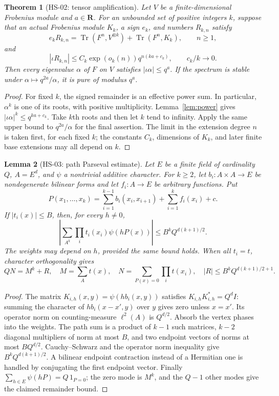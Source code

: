 \documentclass[11pt,a4paper]{article}
\newtheorem{theorem}{Theorem}[section]
\newtheorem{lemma}[theorem]{Lemma}
\theoremstyle{remark}
\begin{document}
\begin{theorem}[HS-02: tensor amplification]
\label{thm:tensor}
Let $V$ be a finite-dimensional Frobenius module and $a\in\mathbf R$.
For an unbounded set of positive integers $k$, suppose that an actual
Frobenius module $K_k$, a sign $e_k$, and numbers $R_{k,n}$ satisfy
\[
 e_kR_{k,n}=\operatorname{Tr}(F^n,V^{\otimes k})
                  +\operatorname{Tr}(F^n,K_k),\qquad n\ge1,
\]
and
\[
 |\iota R_{k,n}|\le C_k\exp(o_k(n))q^{n(ka+c_k)},
 \qquad c_k/k\longrightarrow0.
\]
Then every eigenvalue $\alpha$ of $F$ on $V$ satisfies
$|\iota\alpha|\le q^a$.
If the spectrum is stable under $\alpha\mapsto q^{2a}/\alpha$, it is pure
of modulus $q^a$.
\end{theorem}
\begin{proof}
For fixed $k$, the signed remainder is an effective power sum.  In
particular, $\alpha^k$ is one of its roots, with positive multiplicity.
Lemma~\ref{lem:power} gives
$|\iota\alpha|^k\le q^{ka+c_k}$.  Take $k$th roots and then let $k$ tend
to infinity.  Apply the same upper bound to $q^{2a}/\alpha$ for the final
assertion.  The limit in the extension degree $n$ is taken first, for each
fixed $k$; the constants $C_k$, dimensions of $K_k$, and later finite base
extensions may all depend on $k$.
\end{proof}

\begin{lemma}[HS-03: path Parseval estimate]
\label{lem:path}
Let $E$ be a finite field of cardinality $Q$, $A=E^d$, and $\psi$ a
nontrivial additive character.  For $k\ge2$, let $b_i:A\times A\to E$
be nondegenerate bilinear forms and let $f_i:A\to E$ be arbitrary
functions.  Put
\[
 P(x_1,\ldots,x_k)=\sum_{i=1}^{k-1}b_i(x_i,x_{i+1})
                         +\sum_{i=1}^k f_i(x_i)+c.
\]
If $|t_i(x)|\le B$, then, for every $h\ne0$,
\[
 \left|\sum_{A^k}\prod_i t_i(x_i)\psi(hP(x))\right|
       \le B^k Q^{d(k+1)/2}.
\]
The weights may depend on $h$, provided the same bound holds.  When all
$t_i=t$, character orthogonality gives
\[
 QN=M^k+R,\quad M=\sum_A t(x),\quad
 N=\sum_{P(x)=0}\prod_i t(x_i),\quad
 |R|\le B^k Q^{d(k+1)/2+1}.
\]
\end{lemma}
\begin{proof}
The matrix $K_{i,h}(x,y)=\psi(hb_i(x,y))$ satisfies
$K_{i,h}K_{i,h}^*=Q^d I$: summing the character of
$hb_i(x-x',y)$ over $y$ gives zero unless $x=x'$.  Its operator norm on
counting-measure $\ell^2(A)$ is $Q^{d/2}$.  Absorb the vertex phases into
the weights.  The path sum is a product of $k-1$ such matrices,
$k-2$ diagonal multipliers of norm at most $B$, and two endpoint vectors
of norms at most $BQ^{d/2}$.  Cauchy--Schwarz and the operator norm
inequality give $B^kQ^{d(k+1)/2}$.  A bilinear endpoint contraction instead
of a Hermitian one is handled by conjugating the first endpoint vector.
Finally
$\sum_{h\in E}\psi(hP)=Q\,1_{P=0}$; the zero mode is $M^k$, and the
$Q-1$ other modes give the claimed remainder bound.
\end{proof}
\end{document}
